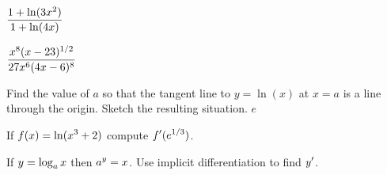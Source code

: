 \exercise $\displaystyle {1+\ln (3x^2 )\over 1+ \ln(4x)}$
\endexercise

\exercise $\displaystyle {x^8 (x-23)^{1/2}\over 27 x^6(4x-6)^8 }$

\endtwocol
\bsk
\endexercise

\exercise Find the value of $a$ so that the tangent line to
$y=\ln(x)$ at $x=a$ is a line through the origin.  Sketch the
 resulting situation.
\answer $e$
\endanswer
\endexercise

\exercise If $\displaystyle f(x) = \ln(x^3 + 2)$ compute $\displaystyle f'(e^{1/3})$.
\endexercise

\exercise If $\displaystyle y=\log_a x$ then $\displaystyle a^y=x$. Use implicit
differentiation to find $\displaystyle y'$.
\endexercise

\endexercises

